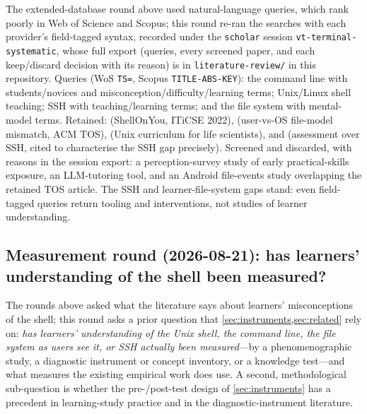 The extended-database round above used natural-language queries, which
rank poorly in Web of Science and Scopus; this round re-ran the searches
with each provider's field-tagged syntax, recorded under the
\texttt{scholar} session \texttt{vt-terminal-systematic}, whose full
export (queries, every screened paper, and each keep/discard decision
with its reason) is in \texttt{literature-review/} in this repository.
Queries (WoS \texttt{TS=}, Scopus \texttt{TITLE-ABS-KEY}): the command
line with students/novices and
misconception/difficulty/learning terms; Unix/Linux shell teaching;
SSH with teaching/learning terms; and the file system with mental-model
terms.
Retained: \autocite{Berry2022ShellOnYou} (ShellOnYou, ITiCSE 2022),
\autocite{May2019FileLifecycle} (user-vs-OS file-model mismatch, ACM
TOS), \autocite{Khamvongsa2026UnixBiologists} (Unix curriculum for life
scientists), and \autocite{Costa2023SSHAssess} (assessment over SSH,
cited to characterise the SSH gap precisely).
Screened and discarded, with reasons in the session export: a
perception-survey study of early practical-skills exposure, an
LLM-tutoring tool, and an Android file-events study overlapping the
retained TOS article.
The SSH and learner-file-system gaps stand: even field-tagged queries
return tooling and interventions, not studies of learner understanding.

\subsection{Measurement round (2026-08-21): has learners' understanding of
the shell been measured?}
\label{sec:protocol-measurement}

The rounds above asked what the literature says about learners'
misconceptions of the shell; this round asks a prior question that
\cref{sec:instruments,sec:related} rely on: \emph{has learners' understanding
of the Unix shell, the command line, the file system as users see it, or
SSH actually been measured}---by a phenomenographic study, a diagnostic
instrument or concept inventory, or a knowledge test---and what measures
the existing empirical work does use.
A second, methodological sub-question is whether the pre-/post-test design
of \cref{sec:instruments} has a precedent in learning-study practice and in the
diagnostic-instrument literature.

